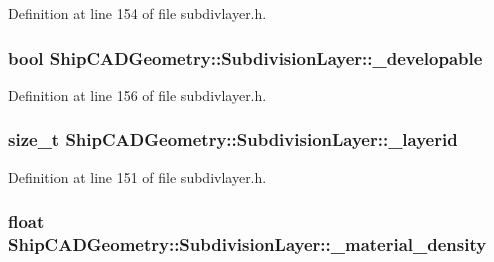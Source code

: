 Definition at line 154 of file subdivlayer.\-h.

\hypertarget{classShipCADGeometry_1_1SubdivisionLayer_a345debb0ab6c8cb47390e26b42db6c19}{
\subsubsection[{\-\_\-developable}]{\setlength{\rightskip}{0pt plus 5cm}bool Ship\-C\-A\-D\-Geometry\-::\-Subdivision\-Layer\-::\-\_\-developable\hspace{0.3cm}{\ttfamily [protected]}}}\label{classShipCADGeometry_1_1SubdivisionLayer_a345debb0ab6c8cb47390e26b42db6c19}


Definition at line 156 of file subdivlayer.\-h.

\hypertarget{classShipCADGeometry_1_1SubdivisionLayer_a8c13850079e9af7429f410e8c74699b8}{
\subsubsection[{\-\_\-layerid}]{\setlength{\rightskip}{0pt plus 5cm}size\-\_\-t Ship\-C\-A\-D\-Geometry\-::\-Subdivision\-Layer\-::\-\_\-layerid\hspace{0.3cm}{\ttfamily [protected]}}}\label{classShipCADGeometry_1_1SubdivisionLayer_a8c13850079e9af7429f410e8c74699b8}


Definition at line 151 of file subdivlayer.\-h.

\hypertarget{classShipCADGeometry_1_1SubdivisionLayer_ac68f5ccf5f32d072ba54d1000e1fb5d3}{
\subsubsection[{\-\_\-material\-\_\-density}]{\setlength{\rightskip}{0pt plus 5cm}float Ship\-C\-A\-D\-Geometry\-::\-Subdivision\-Layer\-::\-\_\-material\-\_\-density\hspace{0.3cm}{\ttfamily [protected]}}}\label{classShipCADGeometry_1_1SubdivisionLayer_ac68f5ccf5f32d072ba54d1000e1fb5d3}


